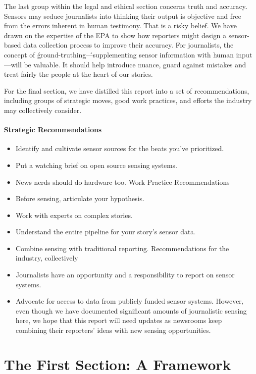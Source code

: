 The last group within the legal and ethical section concerns truth and accuracy.
Sensors may seduce journalists into thinking their output is objective
and free from the errors inherent in human testimony. That is a risky belief.
We have drawn on the expertise of the EPA to show how reporters might
design a sensor-based data collection process to improve their accuracy.
For journalists, the concept of \'ground-truthing\'—supplementing sensor information with human input—will be valuable. It should help introduce
nuance, guard against mistakes and treat fairly the people at the heart of
our stories.

For the final section, we have distilled this report into a set of recommendations,
including groups of strategic moves, good work practices, and efforts
the industry may collectively consider.

\subsection{Strategic Recommendations}
\begin{itemize}
\item Identify and cultivate sensor sources for the beats you've prioritized.
\item Put a watching brief on open source sensing systems.
\item News nerds should do hardware too.
Work Practice Recommendations
\item Before sensing, articulate your hypothesis.
\item Work with experts on complex stories.
\item Understand the entire pipeline for your story's sensor data.
\item Combine sensing with traditional reporting.
Recommendations for the industry, collectively
\item Journalists have an opportunity and a responsibility to report on
sensor systems.
\item Advocate for access to data from publicly funded sensor systems.
However, even though we have documented significant amounts of journalistic
sensing here, we hope that this report will need updates as newsrooms
keep combining their reporters' ideas with new sensing opportunities.
\end{itemize}

\part{The First Section: A Framework}


